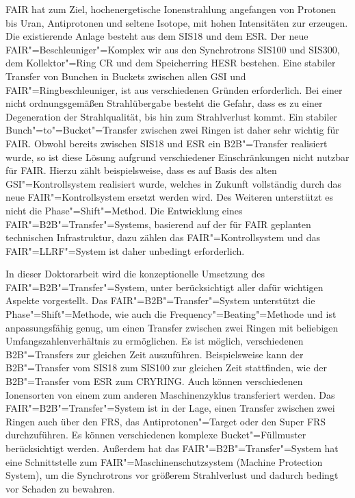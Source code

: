 FAIR hat zum Ziel, hochenergetische Ionenstrahlung angefangen von Protonen bis Uran, Antiprotonen und seltene Isotope, mit hohen Intensit\"aten zur erzeugen. Die existierende Anlage besteht aus dem SIS18 und dem ESR. Der neue FAIR"=Beschleuniger"=Komplex wir aus den Synchrotrons SIS100 und SIS300, dem Kollektor"=Ring CR und dem Speicherring HESR bestehen. Eine stabiler Transfer von Bunchen in Buckets zwischen allen GSI und FAIR"=Ringbeschleuniger, ist aus verschiedenen Gr\"unden erforderlich. Bei einer nicht ordnungsgem\"a\ss{}en Strahl\"ubergabe besteht die Gefahr, dass es zu einer Degeneration der Strahlqualit\"at, bis hin zum Strahlverlust kommt. Ein stabiler Bunch"=to"=Bucket"=Transfer zwischen zwei Ringen ist daher sehr wichtig f\"ur FAIR. Obwohl bereits zwischen SIS18 und ESR ein B2B"=Transfer realisiert wurde, so ist diese L\"osung aufgrund verschiedener Einschr\"ankungen nicht nutzbar f\"ur FAIR. Hierzu z\"ahlt beispielsweise, dass es auf Basis des alten GSI"=Kontrollsystem realisiert wurde, welches in Zukunft vollst\"andig durch das neue FAIR"=Kontrollsystem ersetzt werden wird. Des Weiteren unterst\"utzt es nicht die Phase"=Shift"=Method. Die Entwicklung eines FAIR"=B2B"=Transfer"=Systems, basierend auf der f\"ur FAIR geplanten technischen Infrastruktur, dazu z\"ahlen das FAIR"=Kontrollsystem und das FAIR"=LLRF"=System ist daher unbedingt erforderlich.

In dieser Doktorarbeit wird die konzeptionelle Umsetzung des FAIR"=B2B"=Transfer"=System, unter ber\"ucksichtigt aller daf\"ur wichtigen Aspekte vorgestellt. Das FAIR"=B2B"=Transfer"=System unterst\"utzt die Phase"=Shift"=Methode, wie auch die Frequency"=Beating"=Methode und ist anpassungsf\"ahig genug, um einen Transfer zwischen zwei Ringen mit beliebigen Umfangszahlenverh\"altnis zu erm\"oglichen. Es ist m\"oglich, verschiedenen B2B"=Transfers zur gleichen Zeit auszuf\"uhren. Beispielsweise kann der B2B"=Transfer vom SIS18 zum SIS100 zur gleichen Zeit stattfinden, wie der B2B"=Transfer vom ESR zum CRYRING. Auch k\"onnen verschiedenen Ionensorten von einem zum anderen Maschinenzyklus transferiert werden. Das FAIR"=B2B"=Transfer"=System ist in der Lage, einen Transfer zwischen zwei Ringen auch \"uber den FRS, das Antiprotonen"=Target oder den Super FRS durchzuf\"uhren. Es k\"onnen verschiedenen komplexe Bucket"=F\"ullmuster ber\"ucksichtigt werden. Au\ss{}erdem hat das FAIR"=B2B"=Transfer"=System hat eine Schnittstelle zum FAIR"=Maschinenschutzsystem (Machine Protection System), um die Synchrotrons vor gr\"o\ss{}erem Strahlverlust und dadurch bedingt vor Schaden zu bewahren. 

